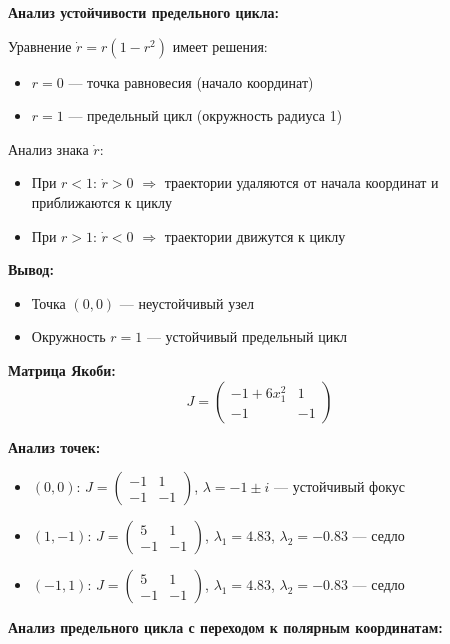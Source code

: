 \textbf{Анализ устойчивости предельного цикла:}

Уравнение $\dot{r} = r(1 - r^2)$ имеет решения:
\begin{itemize}
\item $r = 0$ --- точка равновесия (начало координат)
\item $r = 1$ --- предельный цикл (окружность радиуса 1)
\end{itemize}

Анализ знака $\dot{r}$:
\begin{itemize}
\item При $r < 1$: $\dot{r} > 0$ $\Rightarrow$ траектории удаляются от начала координат и приближаются к циклу
\item При $r > 1$: $\dot{r} < 0$ $\Rightarrow$ траектории движутся к циклу
\end{itemize}

\textbf{Вывод:}
\begin{itemize}
\item Точка $(0,0)$ --- неустойчивый узел
\item Окружность $r = 1$ --- устойчивый предельный цикл
\end{itemize}

\textbf{Матрица Якоби:}
$$J = \begin{pmatrix} -1 + 6x_1^2 & 1 \\ -1 & -1 \end{pmatrix}$$

\textbf{Анализ точек:}
\begin{itemize}
\item $(0, 0)$: $J = \begin{pmatrix} -1 & 1 \\ -1 & -1 \end{pmatrix}$, $\lambda = -1 \pm i$ --- устойчивый фокус
\item $(1, -1)$: $J = \begin{pmatrix} 5 & 1 \\ -1 & -1 \end{pmatrix}$, $\lambda_1 = 4.83$, $\lambda_2 = -0.83$ --- седло
\item $(-1, 1)$: $J = \begin{pmatrix} 5 & 1 \\ -1 & -1 \end{pmatrix}$, $\lambda_1 = 4.83$, $\lambda_2 = -0.83$ --- седло
\end{itemize}

\textbf{Анализ предельного цикла с переходом к полярным координатам:}


